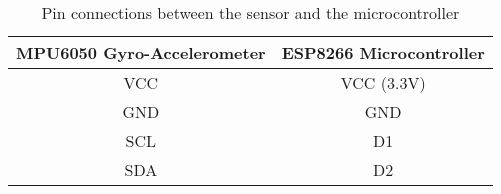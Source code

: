 \documentclass[./main.tex]{subfiles}
\begin{document}
\begin{table}[H]
    \centering
    \begin{tabular}{|c|c|}
    \hline
    MPU6050 Gyro-Accelerometer & ESP8266 Microcontroller \\
    \hline
    VCC & VCC (3.3V) \\
    GND & GND \\
    SCL & D1 \\
    SDA & D2 \\
    \hline
    \end{tabular}
    \caption{Pin connections between the sensor and the microcontroller}
    \label{tab:pin}
\end{table}
\end{document}
